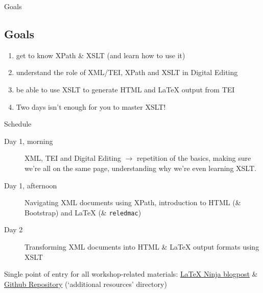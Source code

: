 \documentclass[10pt]{beamer}
\begin{document}
\begin{frame}{Goals}
\subsection{Goals}
\begin{enumerate}
    \item get to know XPath \& XSLT (and learn how to use it)
    \item understand the role of XML/TEI, XPath and XSLT in Digital Editing
    \item be able to use XSLT to generate HTML and \LaTeX{} output from TEI
    \item \alert{Two days isn't enough for you to master XSLT!}
\end{enumerate}

\begin{alertblock}{Schedule}
\footnotesize
\begin{description}
  \item[Day 1, morning] XML, TEI and Digital Editing $\to$ repetition of the basics, making sure we're all on the same page, understanding why we're even learning XSLT.
  \item[Day 1, afternoon] Navigating XML documents using XPath, introduction to HTML (\& Bootstrap) and \LaTeX{} (\& \texttt{reledmac})
  \item[Day 2] Transforming XML documents into HTML \& \LaTeX{} output formats using XSLT
\end{description}
\end{alertblock}
\end{frame}

\begin{frame}[standout]
    Single point of entry for all workshop-related materials: 
    \alert{\href{https://latex-ninja.com/2022/04/17/first-ever-latex-ninja-workshop-at-harvard-beyond-tei-digital-editions-with-xpath-and-xslt-for-the-web-and-in-latex/}{\LaTeX{} Ninja blogpost}} \& \alert{\href{https://github.com/sarahalang/Harvard_BeyondTEI_Workshop_SLang2022}{Github Repository}} (`additional resources' directory)
\end{frame}
\end{document}
